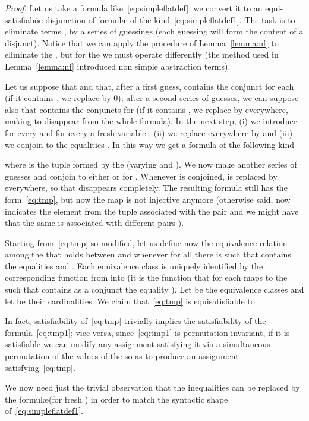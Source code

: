 \documentclass[11pt,a4paper]{article}
\newcommand{\formulae}{formul\ae\xspace}
\begin{document}
\noindent
\textit{Proof.} Let us take a formula like~\eqref{eq:simpleflatdef}: we convert it to an equi-satisfiabòe disjunction of \formulae of the kind~\eqref{eq:simpleflatdef1}. The task is to eliminate terms ,  by a series of guessings (each guessing will form the content
of a disjunct). Notice that
 we can apply the procedure of Lemma~\ref{lemma:nf} to eliminate the , but for the  we must operate differently (the method used  in Lemma~\ref{lemma:nf} introduced non simple abstraction terms). 
 
 Let us suppose that 
  and that, after a first guess,  contains the conjunct  for each
  (if it contains ,  we replace  by 0); after a second series of guesses, we can suppose also that
  contains
 the conjuncts  for  (if it contains , we replace  by  everywhere, making  to disappear from the whole formula).
 In the next step, (i) we introduce for every  and for every  a fresh variable , (ii) we replace everywhere  by 
  and (iii) we conjoin to  the equalities . In this way we get a formula of the following kind
 
where  is the tuple formed by the  (varying  and ). We now make another series of guesses and conjoin to  either 
 or  for . Whenever  is conjoined,  is replaced by 
everywhere, so that  disappears completely. The resulting formula still has the form~\eqref{eq:tmp}, but now the map  is not injective anymore (otherwise said,
  now indicates the element from the tuple  associated with the pair  and we might have that the same  is associated 
 with different pairs ). 
 
 Starting from~\eqref{eq:tmp} so modified, let us define now the equivalence relation among the  that holds
 between  and 
whenever for all  there is  such that  contains the equalities  and . Each equivalence class 
 is uniquely identified by the corresponding function  from  into   (it is the function that for each  maps  to the  such that  contains 
as a conjunct the equality ). Let  be the equivalence classes and let  be their cardinalities.
We claim that~\eqref{eq:tmp} is equisatisfiable to

In fact, satisfiability of~\eqref{eq:tmp} trivially implies the satisfiability of the formula~\eqref{eq:tmp1};
vice versa, since~\eqref{eq:tmp1} is permutation-invariant, if it is satisfiable we can modify any assignment satisfying it via a simultaneous permutation of the values of the  so as to produce  an assignment satisfying~\eqref{eq:tmp}.

We now need just the  trivial observation that the inequalities  can be 
replaced by the \formulae  (for fresh ) in order
to match the syntactic shape of~\eqref{eq:simpleflatdef1}.
  
\end{document}
